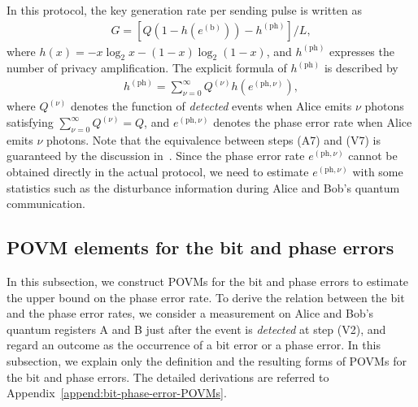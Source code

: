\documentclass[twocolumn,superscriptaddress,pra,footinbib,notitlepage]{revtex4-1}
\newcommand{\1}{\mbox{1}\hspace{-0.25em}\mbox{l}}
\begin{document}
In this protocol, the key generation rate per sending pulse is written as~\cite{gottesman2004security}
\begin{align}
G=[Q(1-h(e^{(\textrm{b})}))-h^{(\textrm{ph})}]/L,\label{eq:keyrate}
\end{align}
where $h(x)=-x\log_2x-(1-x)\log_2(1-x)$, and $h^{(\textrm{ph})}$ expresses the number of privacy amplification. The explicit formula of $h^{(\textrm{ph})}$ is described by
\begin{align}
h^{(\textrm{ph})}=\sum_{\nu=0}^\infty Q^{(\nu)}h(e^{(\textrm{ph}, \nu)}),\label{eq:privacy-amplification}
\end{align}
where $Q^{(\nu)}$ denotes the function of \textit{detected} events when Alice emits $\nu$ photons satisfying $\sum_{\nu=0}^\infty Q^{(\nu)}=Q$, and $e^{(\textrm{ph}, \nu)}$ denotes the phase error rate when Alice emits $\nu$ photons. Note that the equivalence between steps (A7) and (V7) is guaranteed by the discussion in~\cite{shor2000simple}. Since the phase error rate $e^{(\textrm{ph}, \nu)}$ cannot be obtained directly in the actual protocol, we need to estimate $e^{(\textrm{ph}, \nu)}$ with some statistics such as the disturbance information during Alice and Bob's quantum communication.

\subsection{POVM elements for the bit and phase errors}
\label{subsec:POVM-elements}
In this subsection, we construct POVMs for the bit and phase errors to estimate the upper bound on the phase error rate. To derive the relation between the bit and the phase error rates, we consider a measurement on Alice and Bob's quantum registers A and B just after the event is \textit{detected} at step (V2), and regard an outcome as the occurrence of a bit error or a phase error. In this subsection, we explain only the definition and the resulting forms of POVMs for the bit and phase errors.
The detailed derivations are referred to Appendix~\ref{append:bit-phase-error-POVMs}.
\end{document}
